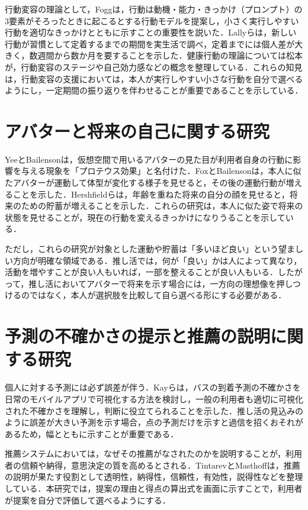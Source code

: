 行動変容の理論として，Fogg\cite{fogg2009}は，行動は動機・能力・きっかけ（プロンプト）の3要素がそろったときに起こるとする行動モデルを提案し，小さく実行しやすい行動を適切なきっかけとともに示すことの重要性を説いた．Lallyら\cite{lally2010}は，新しい行動が習慣として定着するまでの期間を実生活で調べ，定着までには個人差が大きく，数週間から数か月を要することを示した．健康行動の理論については松本\cite{matsumoto2002}が，行動変容のステージや自己効力感などの概念を整理している．これらの知見は，行動変容の支援においては，本人が実行しやすい小さな行動を自分で選べるようにし，一定期間の振り返りを伴わせることが重要であることを示している．

\section{アバターと将来の自己に関する研究}
YeeとBailenson\cite{yee2007}は，仮想空間で用いるアバターの見た目が利用者自身の行動に影響を与える現象を「プロテウス効果」と名付けた．FoxとBailenson\cite{fox2009}は，本人に似たアバターが運動して体型が変化する様子を見せると，その後の運動行動が増えることを示した．Hershfieldら\cite{hershfield2011}は，年齢を重ねた将来の自分の顔を見せると，将来のための貯蓄が増えることを示した．これらの研究は，本人に似た姿で将来の状態を見せることが，現在の行動を変えるきっかけになりうることを示している．

ただし，これらの研究が対象とした運動や貯蓄は「多いほど良い」という望ましい方向が明確な領域である．推し活では，何が「良い」かは人によって異なり，活動を増やすことが良い人もいれば，一部を整えることが良い人もいる．したがって，推し活においてアバターで将来を示す場合には，一方向の理想像を押しつけるのではなく，本人が選択肢を比較して自ら選べる形にする必要がある．

\section{予測の不確かさの提示と推薦の説明に関する研究}
個人に対する予測には必ず誤差が伴う．Kayら\cite{kay2016}は，バスの到着予測の不確かさを日常のモバイルアプリで可視化する方法を検討し，一般の利用者も適切に可視化された不確かさを理解し，判断に役立てられることを示した．推し活の見込みのように誤差が大きい予測を示す場合，点の予測だけを示すと過信を招くおそれがあるため，幅とともに示すことが重要である．

推薦システムにおいては，なぜその推薦がなされたのかを説明することが，利用者の信頼や納得，意思決定の質を高めるとされる．TintarevとMasthoff\cite{tintarev2007}は，推薦の説明が果たす役割として透明性，納得性，信頼性，有効性，説得性などを整理している．本研究では，提案の理由と得点の算出式を画面に示すことで，利用者が提案を自分で評価して選べるようにする．

